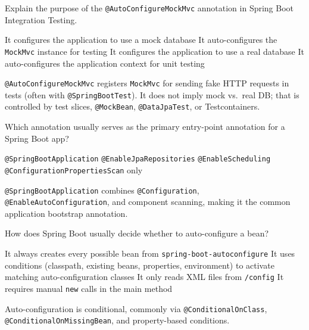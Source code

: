 \question[4]
Explain the purpose of the \texttt{@AutoConfigureMockMvc} annotation in Spring Boot Integration Testing.
\begin{choices}
  \choice It configures the application to use a mock database
  \CorrectChoice It auto-configures the \texttt{MockMvc} instance for testing
  \choice It configures the application to use a real database
  \choice It auto-configures the application context for unit testing
\end{choices}
\begin{solution}
  \texttt{@AutoConfigureMockMvc} registers \texttt{MockMvc} for sending fake HTTP requests in tests (often with \texttt{@SpringBootTest}). It does not imply mock vs.\ real DB; that is controlled by test slices, \texttt{@MockBean}, \texttt{@DataJpaTest}, or Testcontainers.
\end{solution}


\question[4]
Which annotation usually serves as the primary entry-point annotation for a Spring Boot app?
\begin{choices}
  \CorrectChoice \texttt{@SpringBootApplication}
  \choice \texttt{@EnableJpaRepositories}
  \choice \texttt{@EnableScheduling}
  \choice \texttt{@ConfigurationPropertiesScan} only
\end{choices}
\begin{solution}
  \texttt{@SpringBootApplication} combines \texttt{@Configuration}, \texttt{@EnableAutoConfiguration}, and component scanning, making it the common application bootstrap annotation.
\end{solution}

\question[4]
How does Spring Boot usually decide whether to auto-configure a bean?
\begin{choices}
  \choice It always creates every possible bean from \texttt{spring-boot-autoconfigure}
  \CorrectChoice It uses conditions (classpath, existing beans, properties, environment) to activate matching auto-configuration classes
  \choice It only reads XML files from \texttt{/config}
  \choice It requires manual \texttt{new} calls in the main method
\end{choices}
\begin{solution}
  Auto-configuration is conditional, commonly via \texttt{@ConditionalOnClass}, \texttt{@ConditionalOnMissingBean}, and property-based conditions.
\end{solution}

